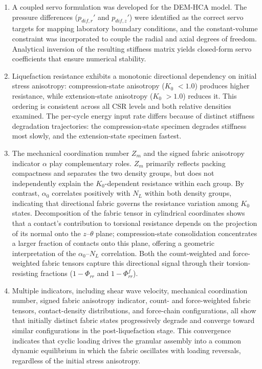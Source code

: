 \documentclass[a4paper,fleqn]{cas-sc}
\newcommand{\Kzero}{\ensuremath{K_0}}
\newcommand{\Zm}{\ensuremath{Z_m}}
\begin{document}
\begin{enumerate}
\item A coupled servo formulation was developed for the DEM-HCA model. The pressure differences ($p_{dif,r}'$ and $p_{dif,z}'$) were identified as the correct servo targets for mapping laboratory boundary conditions, and the constant-volume constraint was incorporated to couple the radial and axial degrees of freedom. Analytical inversion of the resulting stiffness matrix yields closed-form servo coefficients that ensure numerical stability.

\item Liquefaction resistance exhibits a monotonic directional dependency on initial stress anisotropy: compression-state anisotropy (\Kzero{} $< 1.0$) produces higher resistance, while extension-state anisotropy (\Kzero{} $> 1.0$) reduces it. This ordering is consistent across all CSR levels and both relative densities examined. The per-cycle energy input rate differs because of distinct stiffness degradation trajectories: the compression-state specimen degrades stiffness most slowly, and the extension-state specimen fastest.

\item The mechanical coordination number \Zm{} and the signed fabric anisotropy indicator $\alpha$ play complementary roles. \Zm{} primarily reflects packing compactness and separates the two density groups, but does not independently explain the \Kzero{}-dependent resistance within each group. By contrast, $\alpha_0$ correlates positively with $N_L$ within both density groups, indicating that directional fabric governs the resistance variation among \Kzero{} states. Decomposition of the fabric tensor in cylindrical coordinates shows that a contact's contribution to torsional resistance depends on the projection of its normal onto the $z$--$\theta$ plane; compression-state consolidation concentrates a larger fraction of contacts onto this plane, offering a geometric interpretation of the $\alpha_0$--$N_L$ correlation. Both the count-weighted and force-weighted fabric tensors capture this directional signal through their torsion-resisting fractions ($1 - \Phi_{rr}$ and $1 - \Phi^f_{rr}$).

\item Multiple indicators, including shear wave velocity, mechanical coordination number, signed fabric anisotropy indicator, count- and force-weighted fabric tensors, contact-density distributions, and force-chain configurations, all show that initially distinct fabric states progressively degrade and converge toward similar configurations in the post-liquefaction stage. This convergence indicates that cyclic loading drives the granular assembly into a common dynamic equilibrium in which the fabric oscillates with loading reversals, regardless of the initial stress anisotropy.

\end{enumerate}
\end{document}
